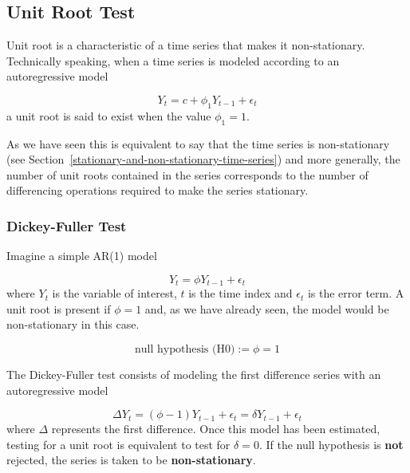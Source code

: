 \subsection{Unit Root Test}\label{unit-root-test}

Unit root is a characteristic of a time series that makes it
non-stationary. Technically speaking, when 
a time series is modeled according to an autoregressive model 

\begin{equation}
Y_t = c + \phi_1 Y_{t-1} + \epsilon_t
\end{equation} 
a unit root is said to exist when the value \(\phi_1 = 1\).

As we have seen this is equivalent to say that the time series is
non-stationary (see Section~\ref{stationary-and-non-stationary-time-series}) and more generally, 
the number of unit roots contained in the series corresponds to 
the number of differencing operations required to make the series stationary.

\subsubsection{Dickey-Fuller Test}\label{dickey-fuller-test}

Imagine a simple AR(1) model

\begin{equation}
Y_t = \phi Y_{t − 1} + \epsilon_t
\end{equation}
where \(Y_t\) is the variable of
interest, \(t\) is the time index and \(\epsilon_t\) is the error term.
A unit root is present if \(\phi = 1\) and, as we have already seen, the
model would be non-stationary in this case.

\begin{equation*}
\textrm{null hypothesis (H0)}:= \phi =1
\end{equation*}

The Dickey-Fuller test consists of modeling the first
difference series with an autoregressive model

\begin{equation}
\Delta Y_t = (\phi − 1) Y_{t − 1} + \epsilon_t = \delta Y_{t − 1} + \epsilon_t
\end{equation}
where \(\Delta\) represents the first difference. Once this model has
been estimated, testing for a unit root is equivalent to test for
\(\delta = 0\). If the null hypothesis is \textbf{not} rejected, the series is
taken to be \textbf{non-stationary}.

